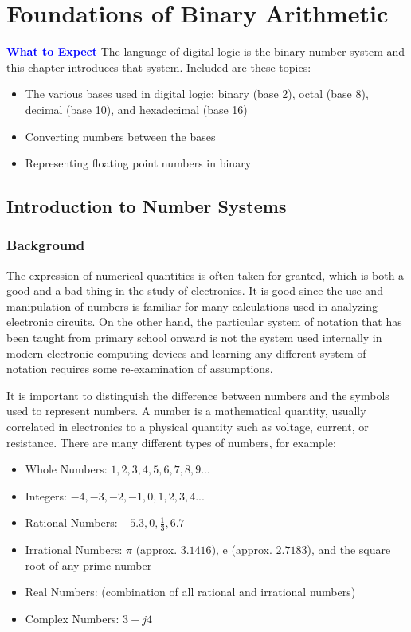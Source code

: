 \chapter{Foundations of Binary Arithmetic}\label{ch02}

\begin{tcolorbox}[colback=blue!5!white,colframe=blue!75!black]
	\textcolor{blue}{\textbf{What to Expect}}
	\tcblower
	The language of digital logic is the binary number system and this chapter introduces that system. Included are these topics: 
	
	\begin{itemize}
		\item The various bases used in digital logic: binary (base 2), octal (base 8), decimal (base 10), and hexadecimal (base 16)
		\item Converting numbers between the bases
		\item Representing floating point numbers in binary
	\end{itemize}
\end{tcolorbox}

\section{Introduction to Number Systems}
\subsection{Background}

The expression of numerical quantities is often taken for granted, which is both a good and a bad thing in the study of electronics. It is good since the use and manipulation of numbers is familiar for many calculations used in analyzing electronic circuits. On the other hand, the particular system of notation that has been taught from primary school onward is not the system used internally in modern electronic computing devices and learning any different system of notation requires some re-examination of assumptions.

It is important to distinguish the difference between numbers and the symbols used to represent numbers. A number is a mathematical quantity, usually correlated in electronics to a physical quantity such as voltage, current, or resistance. There are many different types of numbers, for example:

\begin{itemize}
  \item Whole Numbers: $ 1, 2, 3, 4, 5, 6, 7, 8, 9 ... $
  \item Integers: $ -4, -3, -2, -1, 0, 1, 2, 3, 4 ...  $
  \item Rational Numbers: $ -5.3, 0, \frac{1}{3}, 6.7 $
  \item Irrational Numbers: $\pi $ (approx. $ 3.1416 $), e (approx. $ 2.7183 $), and the square root of any prime number 
  \item Real Numbers: (combination of all rational and irrational numbers) 
  \item Complex Numbers: $ 3 - j4 $
\end{itemize}

